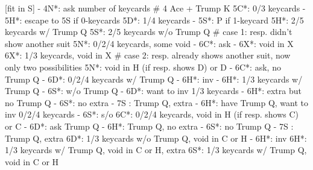 [fit in S] - 4N*: ask number of keycards  # 4 Ace + Trump K
5C*: 0/3 keycards
   - 5H*: escape to 5S if 0-keycards
5D*: 1/4 keycards
   - 5S*: P if 1-keycard
5H*: 2/5 keycards w/ Trump Q
5S*: 2/5 keycards w/o Trump Q
# case 1: resp. didn't show another suit
5N*: 0/2/4 keycards, some void
   - 6C*: ask
        - 6X*: void in X
6X*: 1/3 keycards, void in X
# case 2: resp. already shows another suit, now only two possibilities
5N*: void in H (if resp. shows D) or D
   - 6C*: ask, no Trump Q
        - 6D*: 0/2/4 keycards w/ Trump Q
             - 6H*: inv
        - 6H*: 1/3 keycards w/ Trump Q
        - 6S*: w/o Trump Q
   - 6D*: want to inv 1/3 keycards
        - 6H*: extra but no Trump Q
        - 6S*: no extra
        - 7S : Trump Q, extra
   - 6H*: have Trump Q, want to inv 0/2/4 keycards
   - 6S*: s/o
6C*: 0/2/4 keycards, void in H (if resp. shows C) or C
   - 6D*: ask Trump Q
        - 6H*: Trump Q, no extra
        - 6S*: no Trump Q
        - 7S : Trump Q, extra
6D*: 1/3 keycards w/o Trump Q, void in C or H
   - 6H*: inv
6H*: 1/3 keycards w/ Trump Q, void in C or H, extra
6S*: 1/3 keycards w/ Trump Q, void in C or H
